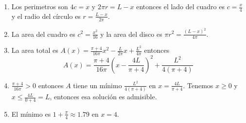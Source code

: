 \begin{enumerate}
\item Los perimetros son $4c = x$ y $2 \pi r = L - x$ entonces
  el lado del cuadro es $c = \frac{x}{4}$ y el radio del círculo es
  $r = \frac{L-x}{2 \pi}$.
\item La area del cuadro es $c^2 = \frac{x^2}{16}$ y la area del disco
  es $\pi r^2 = \frac{{(L-x)}^2}{4\pi}$.
\item La area total es $A(x) = \frac{\pi+4}{16\pi} x^2 - \frac{L}{2\pi}x + \frac{L^2}{4\pi}$ entonces
$$
A(x) = \frac{\pi+4}{16 \pi} \left( x - \frac{4L}{\pi+4}\right)^2 +
\frac{L^2}{4\left(\pi+4\right)}
$$

\item $\frac{\pi+4}{16 \pi} > 0$ entonces $A$ tiene un
  mínimo $\frac{L^2}{4\left(\pi+4\right)}$ en
  $x = \frac{4L}{\pi+4}$. Tenemos $x \geq 0$ y $x \leq \frac{4L}{0+4} = L$,
  entonces esa solución es admisible.

\item El mínimo es $1 + \frac{\pi}{4} \approx 1.79$ en $x = 4$.

\begin{center}
\end{center}

\end{enumerate}
